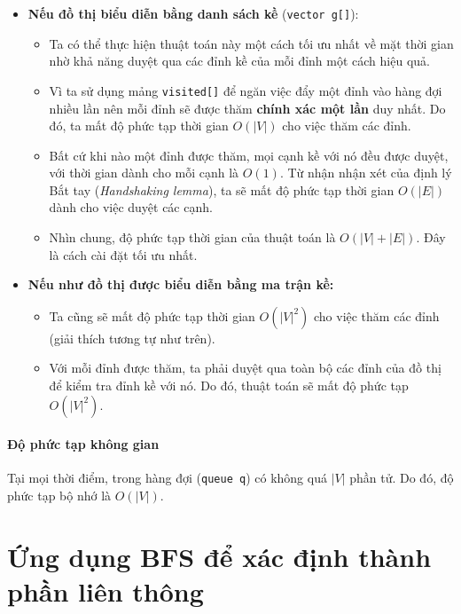 \begin{itemize}
    \item \textbf{Nếu đồ thị biểu diễn bằng danh sách kề} (\texttt{vector g[]}):

    \begin{itemize}
        \item Ta có thể thực hiện thuật toán này một cách tối ưu nhất về mặt thời gian nhờ khả năng duyệt qua các đỉnh kề của mỗi đỉnh một cách hiệu quả.
        \item Vì ta sử dụng mảng \texttt{visited[]} để ngăn việc đẩy một đỉnh vào hàng đợi nhiều lần nên mỗi đỉnh sẽ được thăm \textbf{chính xác một lần} duy nhất. Do đó, ta mất độ phức tạp thời gian $O(|V|)$ cho việc thăm các đỉnh.
        \item Bất cứ khi nào một đỉnh được thăm, mọi cạnh kề với nó đều được duyệt, với thời gian dành cho mỗi cạnh là $O(1)$. Từ nhận nhận xét của định lý Bắt tay (\textit{Handshaking lemma}), ta sẽ mất độ phức tạp thời gian $O(|E|)$ dành cho việc duyệt các cạnh.
        \item Nhìn chung, độ phức tạp thời gian của thuật toán là $O(|V| + |E|)$. Đây là cách cài đặt tối ưu nhất.
    \end{itemize}

    \item \textbf{Nếu như đồ thị được biểu diễn bằng ma trận kề:}
    \begin{itemize}
        \item Ta cũng sẽ mất độ phức tạp thời gian $O(|V|^2)$ cho việc thăm các đỉnh (giải thích tương tự như trên).
        \item Với mỗi đỉnh được thăm, ta phải duyệt qua toàn bộ các đỉnh của đồ thị để kiểm tra đỉnh kề với nó. Do đó, thuật toán sẽ mất độ phức tạp $O(|V|^2)$.
    \end{itemize}
\end{itemize}

\paragraph{Độ phức tạp không gian}
Tại mọi thời điểm, trong hàng đợi (\texttt{queue q}) có không quá $|V|$ phần tử. Do đó, độ phức tạp bộ nhớ là $O(|V|)$.

\section{Ứng dụng BFS để xác định thành phần liên thông}

